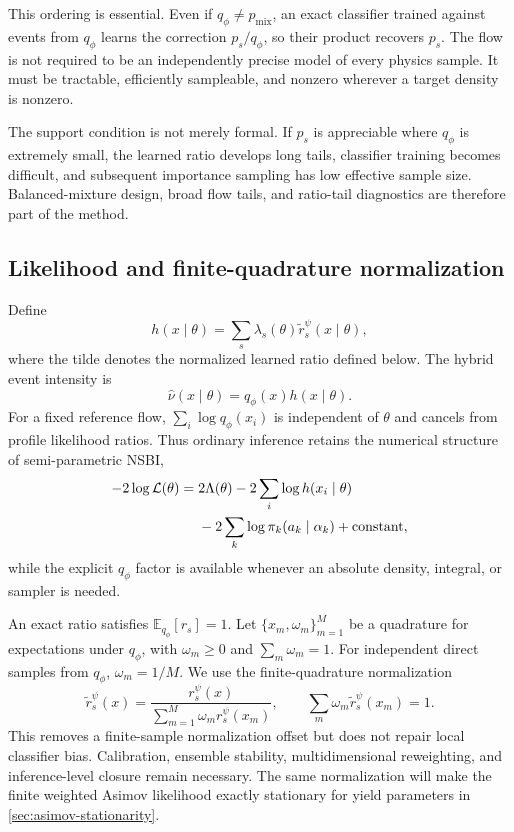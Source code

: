 \documentclass[
  aps,
  prd,
  superscriptaddress,
  nofootinbib,
  longbibliography,
  12pt
]{revtex4-2}
\newcommand{\E}{\mathbb{E}}
\newcommand{\Lcal}{\mathcal{L}}
\newcommand{\qRef}{q_{\phi}}
\begin{document}
This ordering is essential.  Even if $\qRef\neq p_{\mathrm{mix}}$, an exact classifier trained against events from $\qRef$ learns the correction $p_s/\qRef$, so their product recovers $p_s$.  The flow is not required to be an independently precise model of every physics sample.  It must be tractable, efficiently sampleable, and nonzero wherever a target density is nonzero.

The support condition is not merely formal.  If $p_s$ is appreciable where $\qRef$ is extremely small, the learned ratio develops long tails, classifier training becomes difficult, and subsequent importance sampling has low effective sample size.  Balanced-mixture design, broad flow tails, and ratio-tail diagnostics are therefore part of the method.

\subsection{Likelihood and finite-quadrature normalization}

Define
\begin{equation}
  h(x\mid\theta)
  =\sum_s\lambda_s(\theta)\widetilde r_s^\psi(x\mid\theta),
  \label{eq:h-definition}
\end{equation}
where the tilde denotes the normalized learned ratio defined below.  The hybrid event intensity is
\begin{equation}
  \widehat\nu(x\mid\theta)=\qRef(x)h(x\mid\theta).
  \label{eq:hybrid-intensity}
\end{equation}
For a fixed reference flow, $\sum_i\log\qRef(x_i)$ is independent of $\theta$ and cancels from profile likelihood ratios.  Thus ordinary inference retains the numerical structure of semi-parametric NSBI,
\begin{align}
  -2\log\Lcal(\theta)
  ={}&2\Lambda(\theta)-2\sum_i\log h(x_i\mid\theta)\notag\\
  &-2\sum_k\log\pi_k(a_k\mid\alpha_k)+\text{constant},
  \label{eq:hybrid-nll}
\end{align}
while the explicit $\qRef$ factor is available whenever an absolute density, integral, or sampler is needed.

An exact ratio satisfies $\E_{\qRef}[r_s]=1$.  Let $\{x_m,\omega_m\}_{m=1}^M$ be a quadrature for expectations under $\qRef$, with $\omega_m\geq0$ and $\sum_m\omega_m=1$.  For independent direct samples from $\qRef$, $\omega_m=1/M$.  We use the finite-quadrature normalization
\begin{equation}
  \widetilde r_s^\psi(x)
  =\frac{r_s^\psi(x)}
  {\sum_{m=1}^{M}\omega_m r_s^\psi(x_m)},
  \qquad
  \sum_m\omega_m\widetilde r_s^\psi(x_m)=1.
  \label{eq:empirical-ratio-normalization}
\end{equation}
This removes a finite-sample normalization offset but does not repair local classifier bias.  Calibration, ensemble stability, multidimensional reweighting, and inference-level closure remain necessary.  The same normalization will make the finite weighted Asimov likelihood exactly stationary for yield parameters in \cref{sec:asimov-stationarity}.
\end{document}
